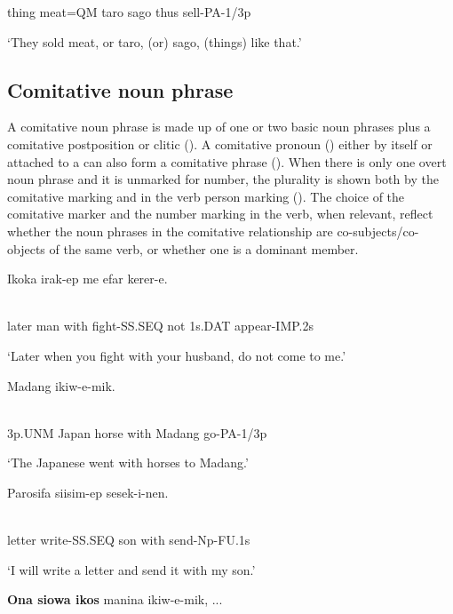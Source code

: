 thing  meat=QM  taro  sago  thus  sell-PA-1/3p

`They sold meat, or taro, (or) sago, (things) like that.'

\subsection{Comitative noun phrase}
\hypertarget{RefHeading21701935131865}{}
A comitative noun phrase is made up of one or two basic noun phrases plus a comitative postposition or clitic (). A comitative pronoun () either by itself or attached to a  can also form a comitative phrase (). When there is only one overt noun phrase and it  is unmarked for number, the plurality is shown both by the comitative marking and in the verb person marking (). The choice of the comitative marker and the number marking in the verb, when relevant,  reflect whether the noun phrases in the comitative relationship are co-subjects/co-objects of the same verb, or whether one is a dominant member. 

\ea%
\label{ex:x828}
\gll Ikoka    irak-ep  me  efar  kerer-e. \\
      \\
\glt
\z

later  man  with  fight-SS.SEQ  not  1s.DAT  appear-IMP.2s

`Later when you fight with your husband, do not come to me.'

\ea%
\label{ex:x829}
\gll {}  Madang  ikiw-e-mik. \\
      \\
\glt
\z

3p.UNM  Japan  horse  with  Madang  go-PA-1/3p

`The Japanese went with horses to Madang.'

\ea%
\label{ex:x830}
\gll Parosifa  siisim-ep    sesek-i-nen. \\
      \\
\glt
\z

letter  write-SS.SEQ  son  with  send-Np-FU.1s

`I will write a letter and send it with my son.'

\ea%
\label{ex:x819}
\gll \textbf{Ona  siowa  ikos } manina  ikiw-e-mik, ... \\
      \\
\glt
\z

